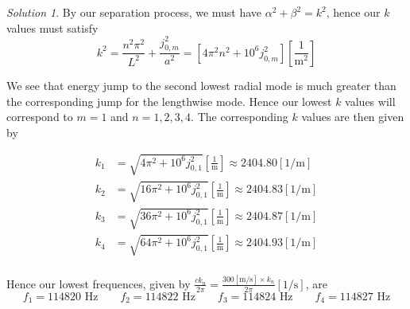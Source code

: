 \documentclass[12pt,a4paper]{article}
\theoremstyle{definition}
\theoremstyle{remark}
\newtheorem*{solution}{Solution}
\begin{document}
\begin{solution}
    By our separation process, we must have $\alpha^2 + \beta^2 = k^2$, hence our $k$ values must satisfy $$k^2 = \frac{n^2 \pi^2}{L^2} + \frac{j_{0,m}^2}{a^2} = [4 \pi^2 n^2 + 10^6 j_{0,m}^2] [\frac{1}{\text{m}^2}]$$

    We see that energy jump to the second lowest radial mode is much greater than the corresponding jump for the lengthwise mode. Hence our lowest $k$ values will correspond to $m = 1$ and $n=1, 2, 3, 4$. The corresponding $k$ values are then given by 

    \begin{align*}
        k_1 &= \sqrt{4 \pi^2 + 10^6 j_{0,1}^2} [\frac{1}{\text{m}}] \approx 2404.80 [1/\text{m}]  \\
        k_2 &= \sqrt{16 \pi^2 + 10^6 j_{0,1}^2} [\frac{1}{\text{m}}] \approx 2404.83 [1/\text{m}] \\
        k_3 &= \sqrt{36 \pi^2 + 10^6 j_{0,1}^2} [\frac{1}{\text{m}}] \approx 2404.87 [1/\text{m}] \\
        k_4 &= \sqrt{64 \pi^2 + 10^6 j_{0,1}^2} [\frac{1}{\text{m}}] \approx 2404.93 [1/\text{m}] \\
    \end{align*}

    Hence our lowest frequences, given by $\frac{ck_n}{2\pi} = \frac{300 [\text{m/s}]\times k_n}{2 \pi} [1/\text{s}]$, are $$f_1 = 114820 \text{ Hz} \qquad f_2 =  114822 \text{ Hz} \qquad f_3 = 114824 \text{ Hz} \qquad f_4 =  114827 \text{ Hz}$$
\end{solution}
\end{document}
